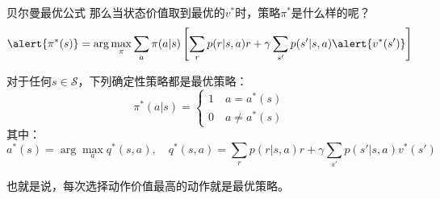 \begin{frame}{贝尔曼最优公式}
    那么当状态价值取到最优的$v^*$时，策略$\pi^*$是什么样的呢？
    \[
        \alert{\pi^*(s)}=\arg\underset{\pi}{\max}\sum_a\pi(a|s)\left[\sum_r p(r|s,a)r+\gamma\sum_{s'}p(s'|s,a)\alert{v^*(s')}\right]
    \]
    \begin{theorem}[贝尔曼最优定理]
        对于任何$s\in \mathcal{S}$，下列确定性策略都是最优策略：
        \[
            \pi^*(a|s)=
            \begin{cases}
                1 \quad a=a^*(s) \\
                0 \quad a\neq a^*(s)
            \end{cases}
        \]
        其中：
        \[
                a^*(s)=\arg\underset{a}{\max} q^*(s,a),\quad
                q^*(s,a)=\sum_r p(r|s,a)r+\gamma\sum_{s'}p(s'|s,a)v^*(s')
        \]
    \end{theorem}

    也就是说，\alert{每次选择动作价值最高的动作就是最优策略。}
\end{frame}

